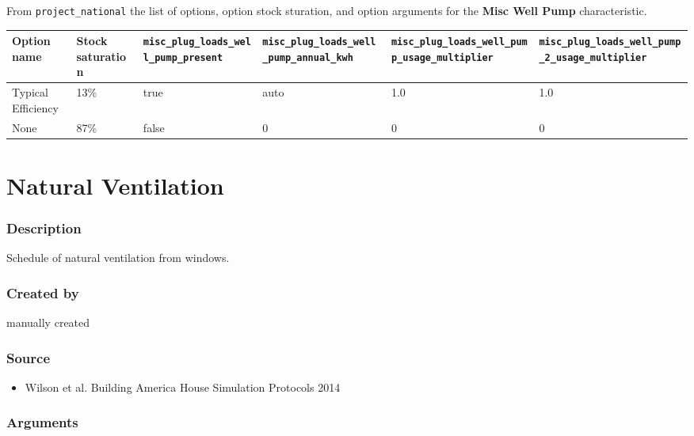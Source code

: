 From \texttt{project\_national} the list of options, option stock
sturation, and option arguments for the \textbf{Misc Well Pump}
characteristic.

\begin{longtable}[]{@{}llllll@{}}
\toprule\noalign{}
Option name & Stock saturation &
\texttt{misc\_plug\_loads\_well\_pump\_present} &
\texttt{misc\_plug\_loads\_well\_pump\_annual\_kwh} &
\texttt{misc\_plug\_loads\_well\_pump\_usage\_multiplier} &
\texttt{misc\_plug\_loads\_well\_pump\_2\_usage\_multiplier} \\
\midrule\noalign{}
\endhead
\bottomrule\noalign{}
\endlastfoot
Typical Efficiency & 13\% & true & auto & 1.0 & 1.0 \\
None & 87\% & false & 0 & 0 & 0 \\
\end{longtable}

\section{Natural Ventilation}\label{natural_ventilation}

\subsubsection{Description}\label{description-120}

Schedule of natural ventilation from windows.

\subsubsection{Created by}\label{created-by-121}

manually created

\subsubsection{Source}\label{source-123}

\begin{itemize}
 
\item
  Wilson et al. \textquotesingle Building America House Simulation
  Protocols\textquotesingle{} 2014
\end{itemize}

\subsubsection{Arguments}\label{arguments-84}



